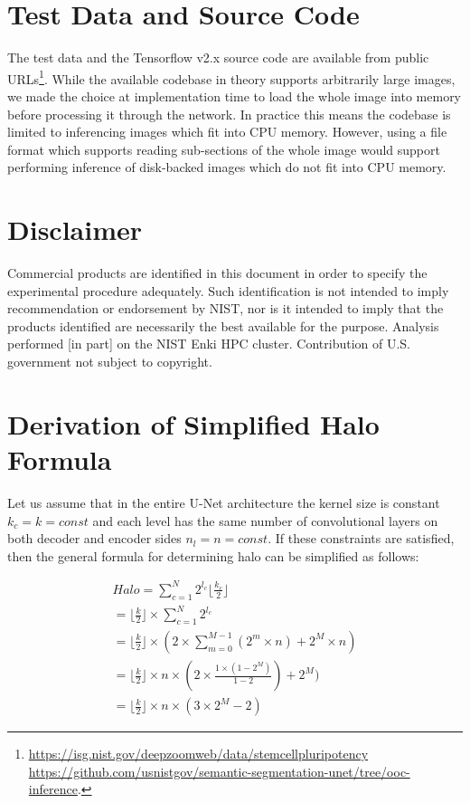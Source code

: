 \documentclass[10pt, indentfirst]{article}
\begin{document}
\section{Test Data and Source Code}
The test data and the Tensorflow v2.x source code are available from public URLs\footnote{
	\url{https://isg.nist.gov/deepzoomweb/data/stemcellpluripotency} \\
	\url{https://github.com/usnistgov/semantic-segmentation-unet/tree/ooc-inference}.}.
While the available codebase in theory supports arbitrarily large images, we made the choice at implementation time to load the whole image into memory before processing it through the network.
In practice this means the codebase is limited to inferencing images which fit into CPU memory.
However, using a file format which supports reading sub-sections of the whole image would support performing inference of disk-backed images which do not fit into CPU memory.

\section{Disclaimer}

Commercial products are identified in this document in order to specify the experimental procedure adequately.
Such identification is not intended to imply recommendation or endorsement by NIST, nor is it intended to imply that the products identified are necessarily the best available for the purpose.
Analysis performed [in part] on the NIST Enki HPC cluster.
Contribution of U.S. government not subject to copyright.

\clearpage

\appendix
\section{Derivation of Simplified Halo Formula}

Let us assume that in the entire U-Net architecture the kernel size is constant $k_{c} = k = const$ and each level has the same number of convolutional layers on both decoder and encoder sides $n_{l} = n = const$.
If these constraints are satisfied, then the general formula for determining halo can be simplified as follows:

\begin{equation}
\begin{aligned}
Halo = \sum_{c=1}^{N} 2^{l_c} \lfloor \frac{k_c}{2} \rfloor \\
= \lfloor \frac{k}{2} \rfloor \times \sum_{c=1}^{N} 2^{l_c} \\
= \lfloor \frac{k}{2} \rfloor \times ( 2 \times \sum_{m=0}^{M-1} (2^{m} \times n) + 2^{M} \times n )  \\
= \lfloor \frac{k}{2} \rfloor \times n \times ( 2 \times \frac{1 \times (1 - 2^M) }{ 1- 2} ) + 2^{M} )  \\
= \lfloor \frac{k}{2} \rfloor \times n \times (3 \times 2^{M} - 2) 
\end{aligned}
\label{eq:halo2}
\end{equation}
\end{document}
